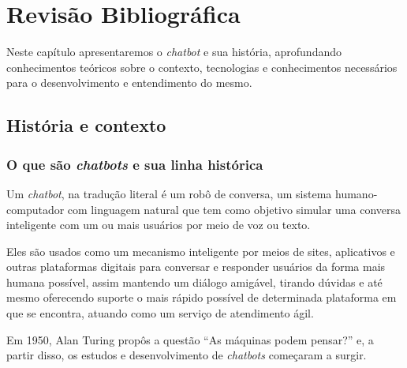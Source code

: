 \documentclass[
	12pt,				%
	oneside,
	a4paper,			%
	english,			%
	french,				%
	spanish,			%
	brazil				%
	]{abntex2}
\begin{document}

%

\chapter{Revisão Bibliográfica}

Neste capítulo apresentaremos o \emph{chatbot} e sua história, aprofundando conhecimentos teóricos sobre o contexto, tecnologias e conhecimentos necessários para o desenvolvimento e entendimento do mesmo. 

\section{História e contexto}

\subsection{O que são \emph{chatbots} e sua linha histórica}

Um \emph{chatbot}, na tradução literal é um robô de conversa, um sistema humano-computador com linguagem natural que tem como objetivo simular uma conversa inteligente com um ou mais usuários por meio de voz ou texto. \cite{chatbot-def}

Eles são usados como um mecanismo inteligente por meios de sites, aplicativos e outras plataformas digitais para conversar e responder usuários da forma mais humana possível, assim mantendo um diálogo amigável, tirando dúvidas e até mesmo oferecendo suporte o mais rápido possível de determinada plataforma em que se encontra, atuando como um serviço de atendimento ágil.

Em 1950, Alan Turing propôs a questão “As máquinas podem pensar?” e, a partir disso, os estudos e desenvolvimento de \emph{chatbots} começaram a surgir.
\end{document}
